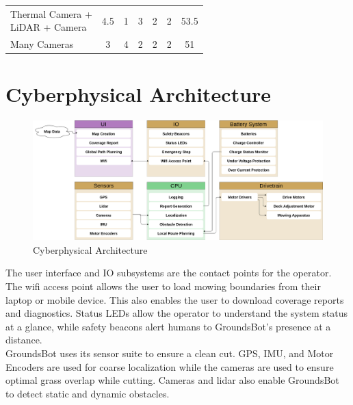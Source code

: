 \documentclass[12pt]{extarticle}
\begin{document}
\begin{table}[H]
\begin{adjustwidth}{0in}{0in}
\begin{tabular}{lcccccc}
		\makecell[l]{Thermal Camera + \\ LiDAR + Camera}             & 4.5     & 1    & 3                               & 2                               & 2                       & 53.5  \\ \hdashline
		Many Cameras                                                 & 3       & 4    & 2                               & 2                               & 2                       & 51    \\ 
		
		\end{tabular}

		\end{adjustwidth}
		\end{table}


\newpage
\section{Cyberphysical Architecture}
\begin{figure}[H]
\includegraphics[scale=0.2]{cyberphysical.png}
\caption{Cyberphysical Architecture}
\label{fig:cyberphysical}
\end{figure}

  The user interface and IO subsystems are the contact points for the operator.  The wifi access point allows the user to load mowing boundaries from their laptop or mobile device.  This also enables the user to download coverage reports and diagnostics.  Status LEDs allow the operator to understand the system status at a glance, while safety beacons alert humans to GroundsBot's presence at a distance.\\

  GroundsBot uses its sensor suite to ensure a clean cut. GPS, IMU, and Motor Encoders are used for coarse localization while the cameras are used to ensure optimal grass overlap while cutting.  Cameras and lidar also enable GroundsBot to detect static and dynamic obstacles.\\
\end{document}
